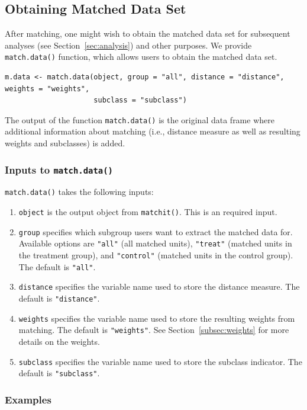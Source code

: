 \documentclass[oneside,letterpaper,titlepage]{article}
\begin{document}
\subsection{Obtaining Matched Data Set}
\label{subsec:match.data}

After matching, one might wish to obtain the matched data set for
subsequent analyses (see Section~\ref{sec:analysis}) and other
purposes. We provide {\tt match.data()} function, which allows users
to obtain the matched data set.
\begin{verbatim}
m.data <- match.data(object, group = "all", distance = "distance", weights = "weights",
                     subclass = "subclass")
\end{verbatim}
The output of the function {\tt match.data()} is the original data
frame where additional information about matching (i.e., distance
measure as well as resulting weights and subclasses) is added.

\subsubsection{Inputs to {\tt match.data()}}

{\tt match.data()} takes the following inputs:
\begin{enumerate}
\item {\tt object} is the output object from {\tt matchit()}. This is
  an required input.
\item {\tt group} specifies which subgroup users want to extract the
  matched data for. Available options are {\tt "all"} (all matched
  units), {\tt "treat"} (matched units in the treatment group), and
  {\tt "control"} (matched units in the control group). The default is
  {\tt "all"}.
\item {\tt distance} specifies the variable name used to store the
  distance measure. The default is {\tt "distance"}.
\item {\tt weights} specifies the variable name used to store the
  resulting weights from matching. The default is {\tt "weights"}. See
  Section~\ref{subsec:weights} for more details on the weights.
\item {\tt subclass} specifies the variable name used to store the
  subclass indicator. The default is {\tt "subclass"}.
\end{enumerate}

\subsubsection{Examples}
\end{document}
